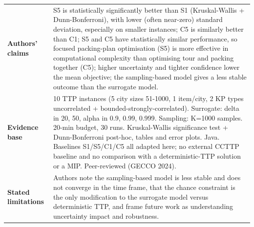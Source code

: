 \documentclass[
  a4paper,
  11pt,
  headings=small,
  numbers=noenddot,
  abstract=on,
  parskip=half,
]{scrartcl}
\begin{document}
\begin{landscape}
\begin{longtable}{@{}p{2.6cm}p{8.7cm}p{2.6cm}p{8.7cm}@{}}
\textbf{Authors' claims} & \multicolumn{3}{p{20.0cm}}{S5 is statistically significantly better than S1 (Kruskal-Wallis + Dunn-Bonferroni), with lower (often near-zero) standard deviation, especially on smaller instances; C5 is similarly better than C1; S5 and C5 have statistically similar performance, so focused packing-plan optimisation (S5) is more effective in computational complexity than optimising tour and packing together (C5); higher uncertainty and tighter confidence lower the mean objective; the sampling-based model gives a less stable outcome than the surrogate model.} \\
\textbf{Evidence base} & \multicolumn{3}{p{20.0cm}}{10 TTP instances (5 city sizes 51-1000, 1 item/city, 2 KP types uncorrelated + bounded-strongly-correlated). Surrogate: delta in {20, 50}, alpha in {0.9, 0.99, 0.999}. Sampling: K=1000 samples. 20-min budget, 30 runs. Kruskal-Wallis significance test + Dunn-Bonferroni post-hoc, tables and error plots. Java. Baselines S1/S5/C1/C5 all adapted here; no external CCTTP baseline and no comparison with a deterministic-TTP solution or a MIP. Peer-reviewed (GECCO 2024).} \\
\textbf{Stated limitations} & \multicolumn{3}{p{20.0cm}}{Authors note the sampling-based model is less stable and does not converge in the time frame, that the chance constraint is the only modification to the surrogate model versus deterministic TTP, and frame future work as understanding uncertainty impact and robustness.} \\

\end{longtable}
\end{landscape}
\end{document}

